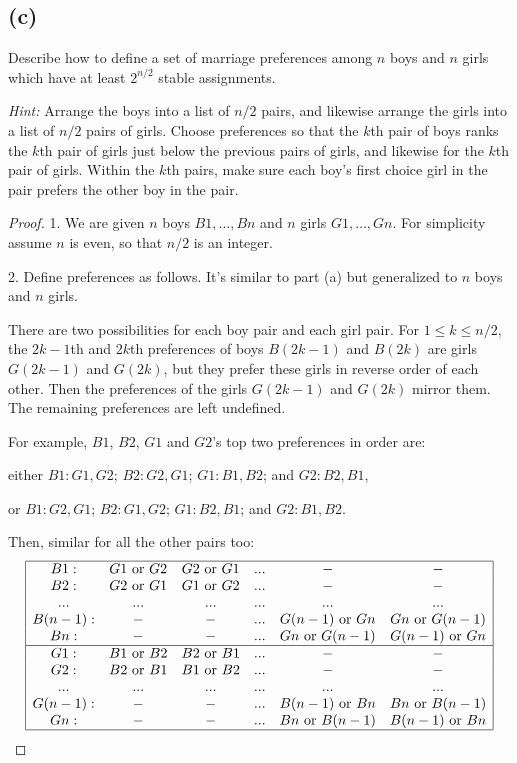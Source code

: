 \documentclass[14pt]{extarticle}
\begin{document}
\subsection{(c)}
Describe how to define a set of marriage preferences among $n$ boys and $n$ girls which have at least $2^{n/2}$ stable assignments.

{\it Hint:} Arrange the boys into a list of $n/2$ pairs, and likewise arrange the girls into a list of $n/2$ pairs of girls. Choose preferences so that the $k$th pair of boys ranks the $k$th pair of girls just below the previous pairs of girls, and likewise for the $k$th pair of girls. Within the $k$th pairs, make sure each boy’s first choice girl in the pair prefers the other boy in the pair.
\begin{proof}
1. We are given $n$ boys $B1, \ldots, Bn$ and $n$ girls $G1, \ldots, Gn$. For simplicity assume $n$ is even, so that $n/2$ is an integer.

2. Define preferences as follows. It's similar to part (a) but generalized to $n$ boys and $n$ girls. 

There are two possibilities for each boy pair and each girl pair. For $1 \leq k \leq n/2$, the $2k-1$th and $2k$th preferences of boys $B(2k-1)$ and $B(2k)$ are girls $G(2k-1)$ and $G(2k)$, but they prefer these girls in reverse order of each other. Then the preferences of the girls $G(2k-1)$ and $G(2k)$ mirror them. The remaining preferences are left undefined.

For example, $B1$, $B2$, $G1$ and $G2$'s top two preferences in order are:

either $B1: G1, G2$; $B2: G2, G1$; $G1: B1, B2$; and $G2: B2, B1$,

or $B1: G2, G1$; $B2: G1, G2$; $G1: B2, B1$; and $G2: B1, B2$.

Then, similar for all the other pairs too:
$$
\begin{array}{|c c c c c c|}
\hline
B1: & G1 \text{ or } G2 & G2 \text{ or } G1 & ... & - & - \\
B2: & G2 \text{ or } G1 & G1 \text{ or } G2 & ... & - & - \\
... & ... & ... & ... & ... & ... \\
B(n-1): & - & - & ... & G(n-1) \text{ or } Gn & Gn \text{ or } G(n-1) \\
Bn: & - & - & ... & Gn \text{ or } G(n-1) & G(n-1) \text{ or } Gn \\
\hline
G1: & B1 \text{ or } B2 & B2 \text{ or } B1 & ... & - & - \\
G2: & B2 \text{ or } B1 & B1 \text{ or } B2 & ... & - & - \\
... & ... & ... & ... & ... & ... \\
G(n-1): & - & - & ... & B(n-1) \text{ or } Bn & Bn \text{ or } B(n-1) \\
Gn: & - & - & ... & Bn \text{ or } B(n-1) & B(n-1) \text{ or } Bn \\
\hline 
\end{array}
$$


\end{proof}
\end{document}
